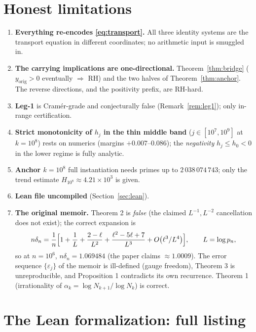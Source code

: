 \documentclass[11pt]{article}
\theoremstyle{remark}
\newcommand{\eps}{\varepsilon}
\begin{document}
\begin{center}
\begin{tabular}{@{}lll@{}}
\bottomrule
\end{tabular}
\end{center}

\appendix
\section{Honest limitations}\label{app:limits}

\begin{enumerate}
\item \textbf{Everything re-encodes \eqref{eq:transport}.} All three identity
systems are the transport equation in different coordinates; no arithmetic
input is smuggled in.
\item \textbf{The carrying implications are one-directional.} Theorem~\ref{thm:bridge}
($y_{\mathrm{orig}}>0$ eventually $\Rightarrow$ RH) and the two halves of
Theorem~\ref{thm:anchor}. The reverse directions, and the positivity prefix,
are RH-hard.
\item \textbf{Leg-1} is Cram\'er-grade and conjecturally false
(Remark~\ref{rem:leg1}); only in-range certification.
\item \textbf{Strict monotonicity of $h_j$ in the thin middle band}
($j\in[10^7,10^9]$ at $k=10^8$) rests on numerics (margins $+0.007$--$0.086$);
the \emph{negativity} $h_j\le h_0<0$ in the lower regime is fully analytic.
\item \textbf{Anchor $k=10^8$} full instantiation needs primes up to
$2\,038\,074\,743$; only the trend estimate $H_{10^8}\approx4.21\times10^3$
is given.
\item \textbf{Lean file uncompiled} (Section~\ref{sec:lean}).
\item \textbf{The original memoir.} Theorem 2 is \emph{false} (the claimed
$L^{-1},L^{-2}$ cancellation does not exist); the correct expansion is
\[
n\delta_n=\frac1n\Bigl[1+\frac1L+\frac{2-\ell}{L^2}+\frac{\ell^2-5\ell+7}{L^3}+O\bigl(\ell^3/L^4\bigr)\Bigr],
\qquad L=\log p_n,
\]
so at $n=10^6$, $n\delta_n=1.069484$ (the paper claims $\approx1.0009$). The
error sequence $\{\eps_j\}$ of the memoir is ill-defined (gauge freedom),
Theorem 3 is unreproducible, and Proposition 1 contradicts its own recurrence.
Theorem 1 (irrationality of $\alpha_k=\log N_{k+1}/\log N_k$) is correct.
\end{enumerate}

\section{The Lean formalization: full listing}\label{app:lean}
\end{document}
